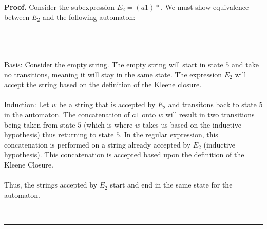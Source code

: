 \documentclass{article}%
\newenvironment{proof}[1][Proof]{\noindent\textbf{#1.} }{\ \rule{0.5em}{0.5em}}
\begin{document}
\begin{proof}
    Consider the subexpression $E_2 = (a1)*$. We must show equivalence between $E_2$ and the following automaton:\\
    \\
    \begin{center}
    \end{center}\\
    \\
    Basis: Consider the empty string. The empty string will start in state $5$ and take no transitions, meaning it
    will stay in the same state. The expression $E_2$ will accept the string based on the definition of the Kleene
    closure.\\
    \\
    Induction: Let $w$ be a string that is accepted by $E_2$ and transitons back to state $5$ in the automaton. The
    concatenation of $a1$ onto $w$ will result in two transitions being taken from state $5$ (which is where $w$ takes
    us based on the inductive hypothesis) thus returning to state $5$. In the regular expression, this concatenation
    is performed on a string already accepted by $E_2$ (inductive hypothesis). This concatenation is accepted based upon
    the definition of the Kleene Closure.\\
    \\
    Thus, the strings accepted by $E_2$ start and end in the same state for the automaton.

\end{proof}
\end{document}
